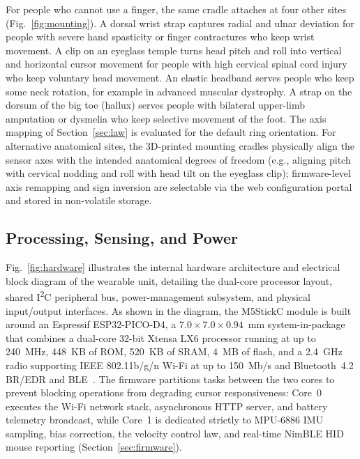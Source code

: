 \documentclass[journal]{IEEEtran}
\begin{document}
For people who cannot use a finger, the same cradle attaches at four other sites (Fig.~\ref{fig:mounting}). A dorsal wrist strap captures radial and ulnar deviation for people with severe hand spasticity or finger contractures who keep wrist movement. A clip on an eyeglass temple turns head pitch and roll into vertical and horizontal cursor movement for people with high cervical spinal cord injury who keep voluntary head movement. An elastic headband serves people who keep some neck rotation, for example in advanced muscular dystrophy. A strap on the dorsum of the big toe (hallux) serves people with bilateral upper-limb amputation or dysmelia who keep selective movement of the foot. The axis mapping of Section~\ref{sec:law} is evaluated for the default ring orientation. For alternative anatomical sites, the 3D-printed mounting cradles physically align the sensor axes with the intended anatomical degrees of freedom (e.g., aligning pitch with cervical nodding and roll with head tilt on the eyeglass clip); firmware-level axis remapping and sign inversion are selectable via the web configuration portal and stored in non-volatile storage.

\subsection{Processing, Sensing, and Power}
\label{sec:sensing}
Fig.~\ref{fig:hardware} illustrates the internal hardware architecture and electrical block diagram of the wearable unit, detailing the dual-core processor layout, shared I\textsuperscript{2}C peripheral bus, power-management subsystem, and physical input/output interfaces. As shown in the diagram, the M5StickC module is built around an Espressif ESP32-PICO-D4, a $7.0\times7.0\times0.94$~mm system-in-package that combines a dual-core 32-bit Xtensa LX6 processor running at up to 240~MHz, 448~KB of ROM, 520~KB of SRAM, 4~MB of flash, and a 2.4~GHz radio supporting IEEE 802.11b/g/n Wi-Fi at up to 150~Mb/s and Bluetooth~4.2 BR/EDR and BLE~\cite{esp32picod4,esp32picoseries}. The firmware partitions tasks between the two cores to prevent blocking operations from degrading cursor responsiveness: Core~0 executes the Wi-Fi network stack, asynchronous HTTP server, and battery telemetry broadcast, while Core~1 is dedicated strictly to MPU-6886 IMU sampling, bias correction, the velocity control law, and real-time NimBLE HID mouse reporting (Section~\ref{sec:firmware}).
\end{document}
